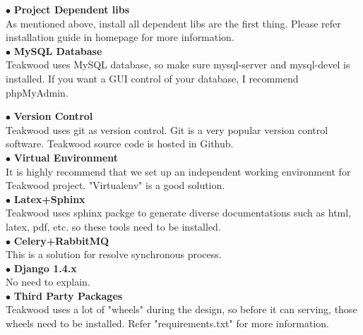 $\bullet$ \textbf{Project Dependent libs}\\
As mentioned above, install all dependent libs are the first thing. Please refer installation guide in homepage for more information.\\

$\bullet$ \textbf{MySQL Database}\\
Teakwood uses MySQL database, so make sure mysql-server and mysql-devel is installed.
If you want a GUI control of your database, I recommend phpMyAdmin. 

$\bullet$ \textbf{Version Control}\\
Teakwood uses git as version control. Git is a very popular version control software. Teakwood source code is hosted in Github.\\

$\bullet$ \textbf{Virtual Environment}\\
It is highly recommend that we set up an independent working environment for Teakwood project. "Virtualenv" is a good solution.\\

$\bullet$ \textbf{Latex+Sphinx}\\
Teakwood uses sphinx packge to generate diverse documentations such as html, latex, pdf, etc. so these tools need to be installed.\\

$\bullet$ \textbf{Celery+RabbitMQ}\\
This is a solution for resolve synchronous process.\\

$\bullet$ \textbf{Django 1.4.x}\\
No need to explain. \\

$\bullet$ \textbf{Third Party Packages}\\
Teakwood uses a lot of "wheels" during the design, so before it can serving, those wheels need to be installed. Refer "requirements.txt" for more information.





